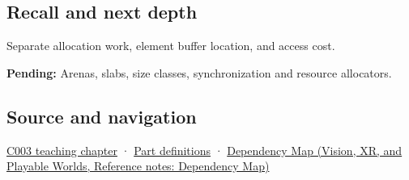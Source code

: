 \subsection{Recall and next depth}\label{appendix-c3480f7d9ff3-recall-and-next-depth}

Separate allocation work, element buffer location, and access cost.

\textbf{Pending:} Arenas, slabs, size classes, synchronization and resource allocators.

\subsection{Source and navigation}\label{appendix-c3480f7d9ff3-source-and-navigation}

\hyperref[01-foundations-i-ch002-where-the-bytes-live]{C003 teaching chapter} · \hyperref[appendix-fd090d982a15-m003---parts-41-60]{Part definitions} · \href{../07-Vision-XR-and-Playable-Worlds/main.pdf\#nameddest=appendix-4ad47bdd269a}{Dependency Map (Vision, XR, and Playable Worlds, Reference notes: Dependency Map)}
